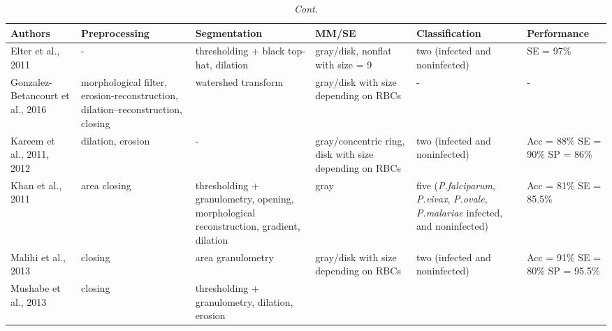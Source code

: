 \documentclass[sensors,review,accept,moreauthors,pdftex,10pt,a4paper]{mdpi}
\begin{document}
\begin{table}[H]\ContinuedFloat
\centering
\tablesize{\footnotesize} 
\caption{{\em Cont.}} \label{xx}
\begin{tabular}{m{3cm}<{\centering}m{3cm}<{\centering}m{5cm}<{\centering}m{3cm}<{\centering}m{5cm}<{\centering}m{2cm}<{\centering}}
		\toprule
    	\textbf{Authors} & \textbf{Preprocessing} & \textbf{Segmentation} & \textbf{MM/SE} & \textbf{Classification} & \textbf{Performance}\\  \midrule	

    Elter et al., 2011 &
		- &
		thresholding + black top-hat, dilation &	
		gray/disk, nonflat with size = 9 &
		two (infected and noninfected) &
		SE = 97\%
\\
\midrule
    Gonzalez-Betancourt et al., 2016  &
    	morphological filter, erosion-reconstruction, dilation--reconstruction, closing &
    	watershed  transform  &
    	gray/disk with size depending on RBCs &
    	- &
    	-
    \\
\midrule
    Kareem et al., 2011, 2012  &
    	dilation, erosion &
    	-  &
    	gray/concentric ring, disk with size depending on RBCs  &
    	two (infected and noninfected) &
    	Acc = 88\% SE = 90\% SP = 86\%
    \\	
    \midrule
    Khan et al., 2011  &
    	area closing &
    	thresholding + granulometry, opening, morphological reconstruction, gradient, dilation &
    	gray &
    	five (\emph{P.falciparum}, \emph{P.vivax}, \emph{P.ovale}, \emph{P.malariae} infected, and noninfected) &
    	Acc = 81\% SE = 85.5\%
    \\	
    \midrule
    Malihi et al., 2013  &
    	closing &
    	area granulometry  &
    	gray/disk with size depending on RBCs &
    	two (infected and noninfected) &
    	Acc = 91\% SE = 80\% SP = 95.5\%
    \\	
    \midrule
    Mushabe et al., 2013  &
    	closing &
    	thresholding + granulometry, dilation, erosion  &

\end{tabular}
\end{table}
\end{document}
